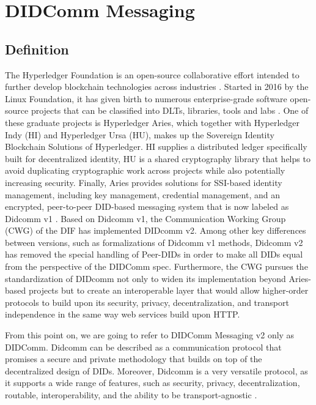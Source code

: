 \section{DIDComm Messaging}\label{section:didcomm}

\subsection{Definition}

The Hyperledger Foundation is an open-source collaborative effort intended to further develop blockchain technologies across industries \cite{jones_boswell_2022}. Started in 2016 by the Linux Foundation, it has given birth to numerous enterprise-grade software open-source projects that can be classified into DLTs, libraries, tools and labs \cite{lusard_lehors_muscara_boswell_zsigri_2021}. One of these graduate projects is Hyperledger Aries, which together with Hyperledger Indy (HI) and Hyperledger Ursa (HU), makes up the Sovereign Identity Blockchain Solutions of Hyperledger. HI supplies a distributed ledger specifically built for decentralized identity, HU is a shared cryptography library that helps to avoid duplicating cryptographic work across projects while also potentially increasing security. Finally, Aries provides solutions for SSI-based identity management, including key management, credential management, and an encrypted, peer-to-peer DID-based messaging system that is now labeled as Didcomm v1 \cite{jones_boswell_2022}. 
Based on Didcomm v1, the Communication Working Group (CWG) of the DIF has implemented DIDcomm v2. Among other key differences between versions, such as formalizations of Didcomm v1 methods, Didcomm v2 has removed the special handling of Peer-DIDs in order to make all DIDs equal from the perspective of the DIDComm spec. Furthermore, the CWG pursues the standardization of DIDcomm not only to widen its implementation beyond Aries-based projects but to create an interoperable layer that would allow higher-order protocols to build upon its security, privacy, decentralization, and transport independence in the same way web services build upon HTTP. \cite{young_2020} \cite{curren_looker_terbu_2020}

From this point on, we are going to refer to DIDComm Messaging v2 only as DIDComm. Didcomm can be described as a communication protocol that promises a secure and private methodology that builds on top of the decentralized design of DIDs. Moreover, Didcomm is a very versatile protocol, as it supports a wide range of features, such as security, privacy, decentralization, routable, interoperability, and the ability to be transport-agnostic \cite{curren_looker_terbu_2020}.

